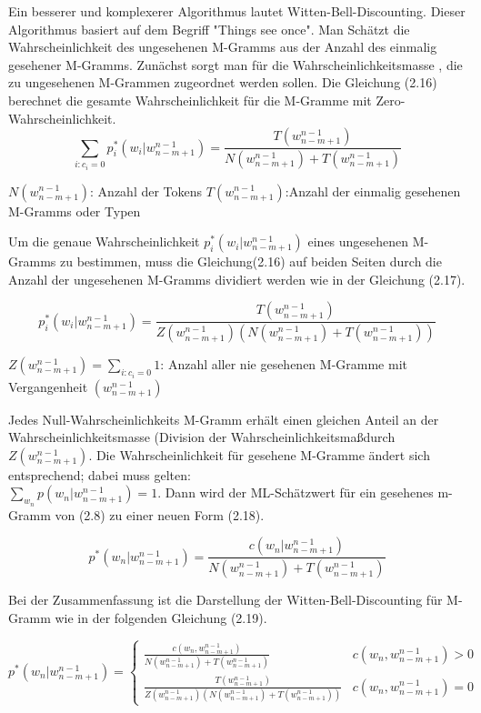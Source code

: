 Ein besserer und komplexerer Algorithmus lautet Witten-Bell-Discounting.
Dieser Algorithmus basiert auf dem Begriff "Things see once". Man Sch\"atzt die Wahrscheinlichkeit des ungesehenen M-Gramms aus der Anzahl des einmalig gesehener M-Gramms. Zun\"achst sorgt man f\"ur die Wahrscheinlichkeitsmasse , die zu ungesehenen M-Grammen zugeordnet werden sollen. Die Gleichung (2.16) berechnet die  gesamte Wahrscheinlichkeit f\"ur  die M-Gramme mit Zero-Wahrscheinlichkeit.
\begin{equation}
\label{equation:witten_bell_01}
\sum_{i:c_{i}=0}p_{i}^{*}(w_{i}|w_{n-m+1}^{n-1})=\frac{T(w_{n-m+1}^{n-1})}{N(w_{n-m+1}^{n-1})+T(w_{n-m+1}^{n-1})}
\end{equation}

$N(w_{n-m+1}^{n-1})$: Anzahl der Tokens
$T(w_{n-m+1}^{n-1})$:Anzahl der einmalig gesehenen M-Gramms oder Typen

Um die genaue Wahrscheinlichkeit $p_{i}^{*}(w_{i}|w_{n-m+1}^{n-1})$ eines ungesehenen M-Gramms zu bestimmen, muss die Gleichung(2.16) auf beiden Seiten durch die Anzahl der ungesehenen M-Gramms dividiert werden wie in der Gleichung (2.17).

\begin{equation}
\label{equation:witten_bell_02}
p_{i}^{*}(w_{i}|w_{n-m+1}^{n-1})=\frac{T(w_{n-m+1}^{n-1})}{Z(w_{n-m+1}^{n-1})(N(w_{n-m+1}^{n-1})+T(w_{n-m+1}^{n-1}))}
\end{equation}

$Z(w_{n-m+1}^{n-1})=\sum_{i:c_{i}=0}1$: Anzahl aller nie gesehenen M-Gramme mit Vergangenheit $(w_{n-m+1}^{n-1})$

Jedes Null-Wahrscheinlichkeits M-Gramm erh\"alt einen gleichen Anteil an der Wahrscheinlichkeitsmasse (Division der Wahrscheinlichkeitsma\ss durch $Z(w_{n-m+1}^{n-1})$.
Die Wahrscheinlichkeit f\"ur gesehene M-Gramme \"andert sich entsprechend; dabei muss gelten:\\ 
$\sum_{w_{n}}p(w_{n}|w_{n-m+1}^{n-1})=1$. Dann wird der ML-Sch\"atzwert  f\"ur ein gesehenes m-Gramm von (2.8) zu einer neuen Form (2.18). 

\begin{equation}
\label{equation:witten_bell_03}
p^{*}(w_{n}|w_{n-m+1}^{n-1})=\frac{c(w_{n}|w_{n-m+1}^{n-1})}{N(w_{n-m+1}^{n-1})+T(w_{n-m+1}^{n-1})}
\end{equation}

Bei der Zusammenfassung ist die Darstellung der Witten-Bell-Discounting f\"ur M-Gramm wie in der folgenden Gleichung (2.19).

\begin{equation}
\label{equationo:witten_bell_04}
p^{*}(w_{n}|w_{n-m+1}^{n-1})=\begin{cases}
\frac{c(w_{n},w_{n-m+1}^{n-1})}{N(w_{n-m+1}^{n-1})+T(w_{n-m+1}^{n-1})} & c(w_{n},w_{n-m+1}^{n-1})>0 \\
\frac{T(w_{n-m+1}^{n-1})}{Z(w_{n-m+1}^{n-1})(N(w_{n-m+1}^{n-1})+T(w_{n-m+1}^{n-1}))} & c(w_{n},w_{n-m+1}^{n-1})=0 
\end{cases}
\end{equation}
